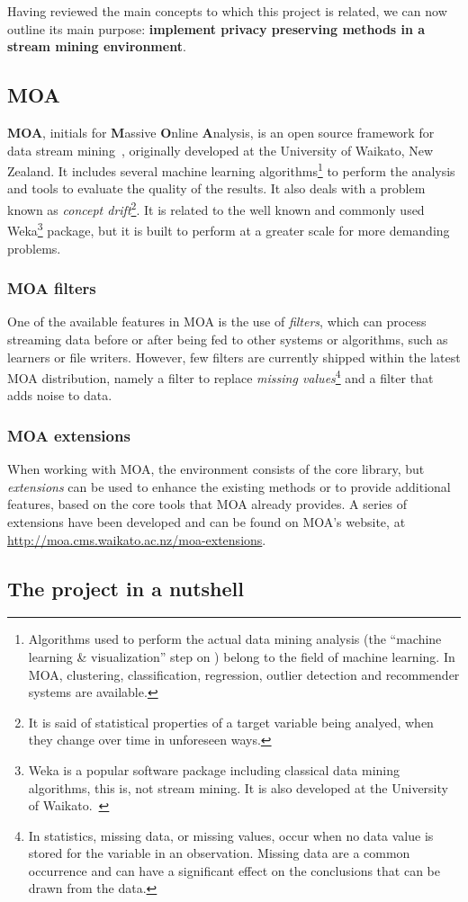 Having reviewed the main concepts to which this project is related, we can now outline
its main purpose: \textbf{implement privacy preserving methods in a stream mining environment}.

\subsection{MOA}

\textbf{MOA}, initials for \textbf{M}assive \textbf{O}nline \textbf{A}nalysis, is an 
open source framework for data stream mining~\citep{web:MOA}, originally 
developed at the University of Waikato, New Zealand. It includes several machine learning 
algorithms\footnote{Algorithms used to perform the actual data mining analysis (the 
“machine learning \& visualization” step on ) belong to the 
field of machine learning. In MOA, clustering, classification, regression, outlier 
detection and recommender systems are available.} to perform the analysis and tools 
to evaluate the quality of the results. It also deals with a problem known as 
\textit{concept drift}\footnote{It is said of statistical properties of a target variable 
being analyed, when they change over time in unforeseen ways.}. It is related to the well
known and commonly used Weka\footnote{Weka is a popular software package including 
classical data mining algorithms, this is, not stream mining. It is also developed at 
the University of Waikato.~\citep{web:Weka}} package, but it is built to perform at 
a greater scale for more demanding problems.

\subsubsection{MOA filters}

One of the available features in MOA is the use of \textit{filters}, which can process
streaming data before or after being fed to other systems or algorithms, such as learners
or file writers. However, few filters are currently shipped within the latest MOA distribution,
namely a filter to replace \textit{missing values}\footnote{In statistics, missing data, or missing values, 
occur when no data value is stored for the variable in an observation. Missing data are a 
common occurrence and can have a significant effect on the conclusions that can be drawn 
from the data.} and a filter that adds noise to data.

\subsubsection{MOA extensions}

When working with MOA, the environment consists of the core library, but \textit{extensions}
can be used to enhance the existing methods or to provide additional features, based on
the core tools that MOA already provides. A series of extensions have been developed and can
be found on MOA's website, at \url{http://moa.cms.waikato.ac.nz/moa-extensions}.

\subsection{The project in a nutshell}